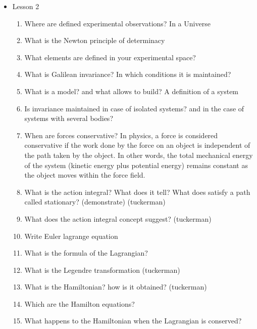 {\begin{itemize}
\begin{enumerate}
        \item What is the critical point? (See tuckerman) What happens?
        \item What is the Ising model? How can you describe with it the critical point?
        \item What is necessary to make Multiscale methods relevant? (hierarchy) The use of a mapping function
        \item What procedure allows the coarse-graining?
    \end{enumerate}
    \item Lesson 2
    \begin{enumerate}
    	\item Where are defined experimental observations? In a Universe
        \item What is the Newton principle of determinacy
        \item What elements are defined in your experimental space?
        \item What is Galilean invariance? In which conditions it is maintained?
        \item What is a model? and what allows to build? A definition of a system
        \item Is invariance maintained in case of isolated systems? and in the case of systems with several bodies?
        \item When are forces conservative? In physics, a force is considered conservative if the work done by the force on an object is independent of the path taken by the object. In other words, the total mechanical energy of the system (kinetic energy plus potential energy) remains constant as the object moves within the force field.
        \item What is the action integral? What does it tell? What does satisfy a path called stationary? (demonstrate) (tuckerman)
        \item What does the action integral concept suggest? (tuckerman)
        \item Write Euler lagrange equation
        \item What is the formula of the Lagrangian?
        \item What is the Legendre transformation (tuckerman)
        \item What is the Hamiltonian? how is it obtained? (tuckerman)
        \item Which are the Hamilton equations?
        \item What happens to the Hamiltonian when the Lagrangian is conserved?

\end{enumerate}
\end{itemize}}
